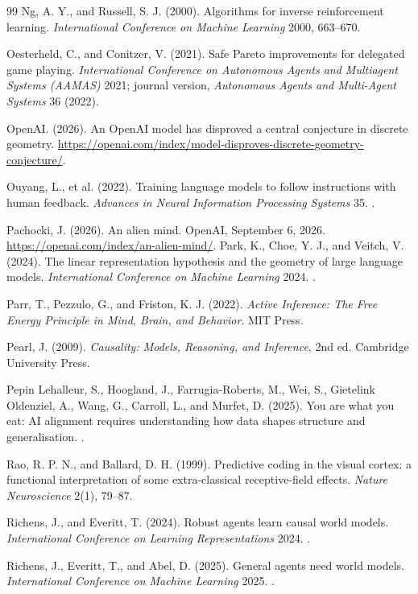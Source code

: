 \begin{thebibliography}{99}
 Ng, A. Y., and Russell, S. J. (2000). Algorithms for inverse reinforcement learning. \emph{International Conference on Machine Learning} 2000, 663--670.

 Oesterheld, C., and Conitzer, V. (2021). Safe Pareto improvements for delegated game playing. \emph{International Conference on Autonomous Agents and Multiagent Systems (AAMAS)} 2021; journal version, \emph{Autonomous Agents and Multi-Agent Systems} 36 (2022).

 OpenAI. (2026). An OpenAI model has disproved a central conjecture in discrete geometry. \url{https://openai.com/index/model-disproves-discrete-geometry-conjecture/}.

 Ouyang, L., et al. (2022). Training language models to follow instructions with human feedback. \emph{Advances in Neural Information Processing Systems} 35. .

 Pachocki, J. (2026). An alien mind. OpenAI, September 6, 2026. \url{https://openai.com/index/an-alien-mind/}.
 Park, K., Choe, Y. J., and Veitch, V. (2024). The linear representation hypothesis and the geometry of large language models. \emph{International Conference on Machine Learning} 2024. .

 Parr, T., Pezzulo, G., and Friston, K. J. (2022). \emph{Active Inference: The Free Energy Principle in Mind, Brain, and Behavior}. MIT Press.

 Pearl, J. (2009). \emph{Causality: Models, Reasoning, and Inference}, 2nd ed. Cambridge University Press.

 Pepin Lehalleur, S., Hoogland, J., Farrugia-Roberts, M., Wei, S., Gietelink Oldenziel, A., Wang, G., Carroll, L., and Murfet, D. (2025). You are what you eat: AI alignment requires understanding how data shapes structure and generalisation. .

 Rao, R. P. N., and Ballard, D. H. (1999). Predictive coding in the visual cortex: a functional interpretation of some extra-classical receptive-field effects. \emph{Nature Neuroscience} 2(1), 79--87.


 Richens, J., and Everitt, T. (2024). Robust agents learn causal world models. \emph{International Conference on Learning Representations} 2024. .


 Richens, J., Everitt, T., and Abel, D. (2025). General agents need world models. \emph{International Conference on Machine Learning} 2025. .


\end{thebibliography}
